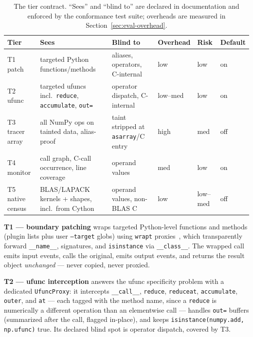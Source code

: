 \begin{table}[t]
  \centering\small
  \caption{The tier contract. ``Sees'' and ``blind to'' are declared in
  documentation and enforced by the conformance test suite; overheads are
  measured in Section~\ref{sec:eval-overhead}.}
  \label{tab:tiers}
  \begin{tabular}{@{}lp{3.4cm}p{3.2cm}lll@{}}
    \toprule
    Tier & Sees & Blind to & Overhead & Risk & Default \\
    \midrule
    T1 patch & targeted Python functions/methods & aliases, operators,
      C-internal & low & low & on \\
    T2 ufunc & targeted ufuncs incl.\ \texttt{reduce},
      \texttt{accumulate}, \texttt{out=} & operator dispatch, C-internal
      & low--med & low & on \\
    T3 tracer array & all NumPy ops on tainted data, alias-proof & taint
      stripped at \texttt{asarray}/C entry & high & med & off \\
    T4 monitor & call graph, C-call occurrence, line coverage & operand
      values & med & low & on \\
    T5 native census & BLAS/LAPACK kernels + shapes, incl.\ from Cython &
      operand values, non-BLAS C & low & low--med & off \\
    \bottomrule
  \end{tabular}
\end{table}

\textbf{T1 --- boundary patching} wraps targeted Python-level functions
and methods (plugin lists plus user \texttt{--target} globs) using
\texttt{wrapt} proxies~\citep{wrapt}, which transparently forward
\texttt{\_\_name\_\_}, signatures, and \texttt{isinstance} via
\texttt{\_\_class\_\_}. The wrapped call emits input events, calls the
original, emits output events, and returns the result object
\emph{unchanged} --- never copied, never proxied.

\textbf{T2 --- ufunc interception} answers the ufunc specificity problem
with a dedicated \texttt{UfuncProxy}: it intercepts \texttt{\_\_call\_\_},
\texttt{reduce}, \texttt{reduceat}, \texttt{accumulate}, \texttt{outer},
and \texttt{at} --- each tagged with the method name, since a
\texttt{reduce} is numerically a different operation than an elementwise
call --- handles \texttt{out=} buffers (summarized after the call,
flagged in-place), and keeps \texttt{isinstance(numpy.add, np.ufunc)}
true. Its declared blind spot is operator dispatch, covered by T3.

